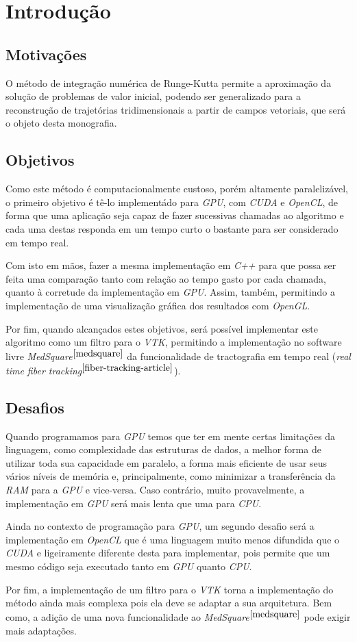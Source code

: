 \chapter{Introdução}

\section{Motivações}
O método de integração numérica de Runge-Kutta permite a aproximação da solução de problemas de valor inicial, podendo ser generalizado para a reconstrução de trajetórias tridimensionais a partir de campos vetoriais, que será o objeto desta monografia.

\section{Objetivos}
Como este método é computacionalmente custoso, porém altamente paralelizável, o primeiro objetivo é tê-lo implementádo para \textit{GPU}, com \textit{CUDA} e \textit{OpenCL}, de forma que uma aplicação seja capaz de fazer sucessivas chamadas ao algoritmo e cada uma destas responda em um tempo curto o bastante para ser considerado em tempo real.

Com isto em mãos, fazer a mesma implementação em \textit{C++} para que possa ser feita uma comparação tanto com relação ao tempo gasto por cada chamada, quanto à corretude da implementação em \textit{GPU}. Assim, também, permitindo a implementação de uma visualização gráfica dos resultados com \textit{OpenGL}.

Por fim, quando alcançados estes objetivos, será possível implementar este algoritmo como um filtro para o \textit{VTK}, permitindo a implementação no software livre \textit{MedSquare}$^{\ref{medsquare}}$ da funcionalidade de tractografia em tempo real (\textit{real time fiber tracking}$^{\ref{fiber-tracking-article}}$).

\section{Desafios}
Quando programamos para \textit{GPU} temos que ter em mente certas limitações da linguagem, como complexidade das estruturas de dados, a melhor forma de utilizar toda sua capacidade em paralelo, a forma mais eficiente de usar seus vários níveis de memória e, principalmente, como minimizar a transferência da \textit{RAM} para a \textit{GPU} e vice-versa. Caso contrário, muito provavelmente, a implementação em \textit{GPU} será mais lenta que uma para \textit{CPU}.

Ainda no contexto de programação para \textit{GPU}, um segundo desafio será a implementação em \textit{OpenCL} que é uma linguagem muito menos difundida que o \textit{CUDA} e ligeiramente diferente desta para implementar, pois permite que um mesmo código seja executado tanto em \textit{GPU} quanto \textit{CPU}.

Por fim, a implementação de um filtro para o \textit{VTK} torna a implementação do método ainda mais complexa pois ela deve se adaptar a sua arquitetura. Bem como, a adição de uma nova funcionalidade ao \textit{MedSquare}$^{\ref{medsquare}}$ pode exigir mais adaptações.
